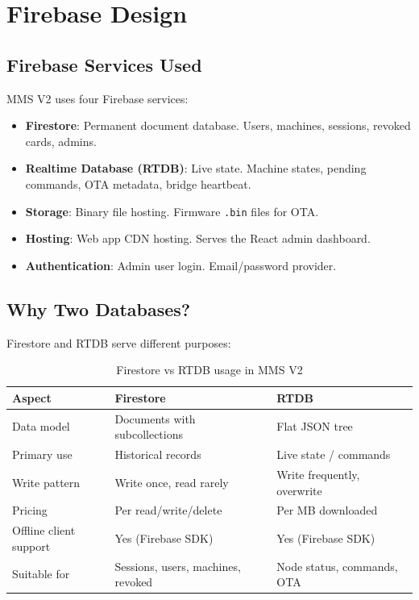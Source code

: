 \chapter{Firebase Design}
\label{ch:firebase}

\section{Firebase Services Used}

MMS V2 uses four Firebase services:
\begin{itemize}[leftmargin=1.5em]
    \item \textbf{Firestore}: Permanent document database. Users, machines, sessions, revoked cards, admins.
    \item \textbf{Realtime Database (RTDB)}: Live state. Machine states, pending commands, OTA metadata, bridge heartbeat.
    \item \textbf{Storage}: Binary file hosting. Firmware \texttt{.bin} files for OTA.
    \item \textbf{Hosting}: Web app CDN hosting. Serves the React admin dashboard.
    \item \textbf{Authentication}: Admin user login. Email/password provider.
\end{itemize}

\section{Why Two Databases?}

Firestore and RTDB serve different purposes:

\begin{table}[H]
\centering
\caption{Firestore vs RTDB usage in MMS V2}
\begin{tabular}{L{4.5cm}L{5.5cm}L{4.5cm}}
\toprule
\textbf{Aspect} & \textbf{Firestore} & \textbf{RTDB} \\
\midrule
Data model & Documents with subcollections & Flat JSON tree \\
Primary use & Historical records & Live state / commands \\
Write pattern & Write once, read rarely & Write frequently, overwrite \\
Pricing & Per read/write/delete & Per MB downloaded \\
Offline client support & Yes (Firebase SDK) & Yes (Firebase SDK) \\
Suitable for & Sessions, users, machines, revoked & Node status, commands, OTA \\
\bottomrule
\end{tabular}
\end{table}

